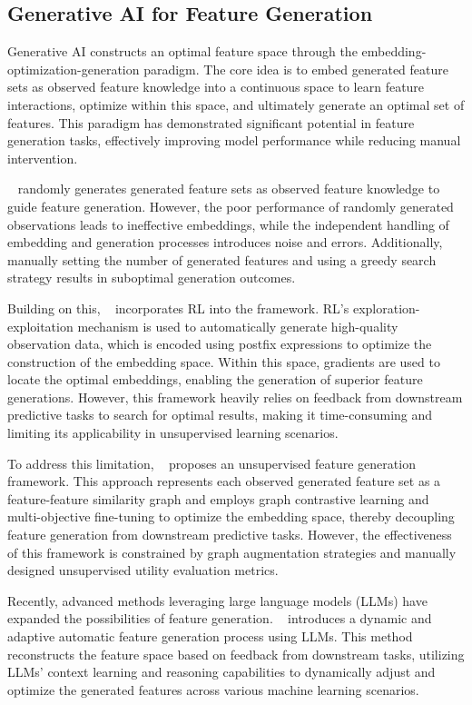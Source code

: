 \subsection{Generative AI for Feature Generation}
Generative AI constructs an optimal feature space through the embedding-optimization-generation paradigm. The core idea is to embed generated feature sets as observed feature knowledge into a continuous space to learn feature interactions, optimize within this space, and ultimately generate an optimal set of features. This paradigm has demonstrated significant potential in feature generation tasks, effectively improving model performance while reducing manual intervention.

~\cite{zhu2022difer} randomly generates generated feature sets as observed feature knowledge to guide feature generation. However, the poor performance of randomly generated observations leads to ineffective embeddings, while the independent handling of embedding and generation processes introduces noise and errors. Additionally, manually setting the number of generated features and using a greedy search strategy results in suboptimal generation outcomes.

Building on this, ~\cite{NIPS@MOAT} incorporates RL into the framework. RL’s exploration-exploitation mechanism is used to automatically generate high-quality observation data, which is encoded using postfix expressions to optimize the construction of the embedding space. Within this space, gradients are used to locate the optimal embeddings, enabling the generation of superior feature generations. However, this framework heavily relies on feedback from downstream predictive tasks to search for optimal results, making it time-consuming and limiting its applicability in unsupervised learning scenarios.

To address this limitation, ~\cite{KDD@NEAT} proposes an unsupervised feature generation framework. This approach represents each observed generated feature set as a feature-feature similarity graph and employs graph contrastive learning and multi-objective fine-tuning to optimize the embedding space, thereby decoupling feature generation from downstream predictive tasks. However, the effectiveness of this framework is constrained by graph augmentation strategies and manually designed unsupervised utility evaluation metrics.

Recently, advanced methods leveraging large language models (LLMs) have expanded the possibilities of feature generation. ~\cite{zhang2024dynamic} introduces a dynamic and adaptive automatic feature generation process using LLMs. This method reconstructs the feature space based on feedback from downstream tasks, utilizing LLMs' context learning and reasoning capabilities to dynamically adjust and optimize the generated features across various machine learning scenarios.

